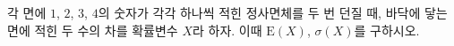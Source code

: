 각 면에 $1$, $2$, $3$, $4$의 숫자가 각각 하나씩 적힌 정사면체를 두 번 던질 때, 바닥에 닿는 면에 적힌 두 수의 차를 확률변수 $X$라 하자. 이때 $\mathrm{E}(X)$, $\sigma(X)$를 구하시오.
